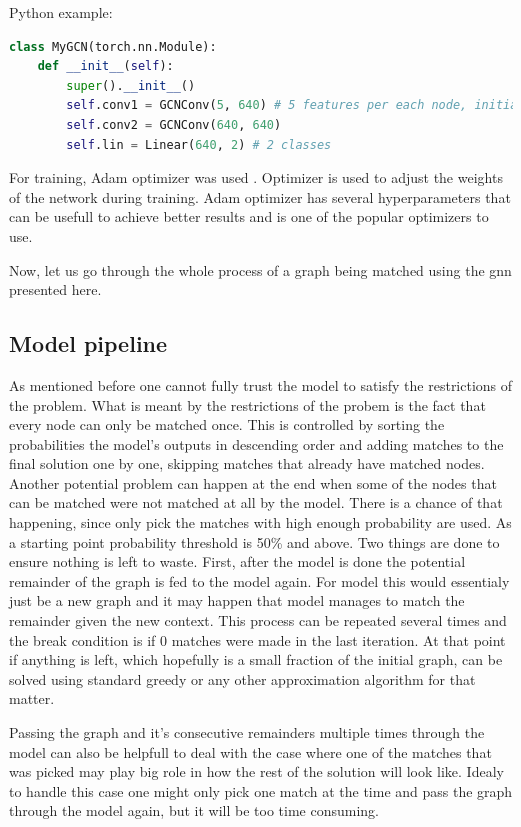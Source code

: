 Python example:
\begin{lstlisting}[language=Python]
class MyGCN(torch.nn.Module):
    def __init__(self):
        super().__init__()
        self.conv1 = GCNConv(5, 640) # 5 features per each node, initialy 1
        self.conv2 = GCNConv(640, 640)
        self.lin = Linear(640, 2) # 2 classes 
\end{lstlisting}

For training, Adam optimizer was used \cite{kingma2017adam}. Optimizer is used to adjust the weights of the network during training. Adam optimizer has several hyperparameters that can be usefull to achieve better results and is one of the popular optimizers to use.

Now, let us go through the whole process of a graph being matched using the \gls{gnn} presented here.

\subsection{Model pipeline}

As mentioned before one cannot fully trust the model to satisfy the restrictions of the problem. What is meant by the restrictions of the probem is the fact that every node can only be matched once. This is controlled by sorting the probabilities the model's outputs in descending order and adding matches to the final solution one by one, skipping matches that already have matched nodes. Another potential problem can happen at the end when some of the nodes that can be matched were not matched at all by the model. There is a chance of that happening, since only pick the matches with high enough probability are used. As a starting point probability threshold is 50\% and above. Two things are done to ensure nothing is left to waste. First, after the model is done the potential remainder of the graph is fed to the model again. For model this would essentialy just be a new graph and it may happen that model manages to match the remainder given the new context. This process can be repeated several times and the break condition is if 0 matches were made in the last iteration. At that point if anything is left, which hopefully is a small fraction of the initial graph, can be solved using standard greedy or any other approximation algorithm for that matter.

Passing the graph and it's consecutive remainders multiple times through the model can also be helpfull to deal with the case where one of the matches that was picked may play big role in how the rest of the solution will look like. Idealy to handle this case one might only pick one match at the time and pass the graph through the model again, but it will be too time consuming.

